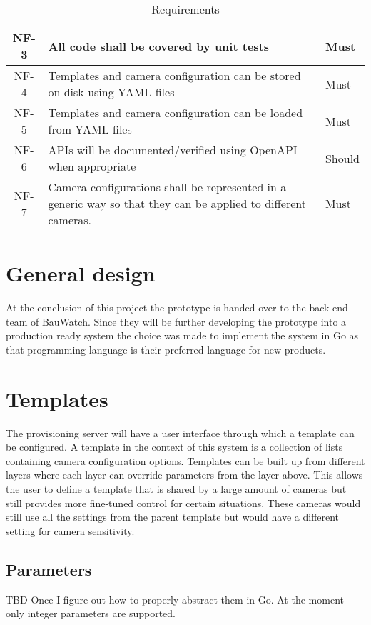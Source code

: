 \begin{table*}[h]
\begin{tabulary}{\linewidth}{CLL}
        \\ \hline
        NF-3 & All code shall be covered by unit tests & Must
        \\ \hline
        NF-4 & Templates and camera configuration can be stored on disk using YAML files & Must
        \\ \hline
        NF-5 & Templates and camera configuration can be loaded from YAML files & Must
        \\ \hline %
        NF-6 & APIs will be documented/verified using OpenAPI when appropriate & Should
        \\ \hline
        NF-7 & Camera configurations shall be represented in a generic way so that they can be applied to different cameras. & Must
    \end{tabulary}
    \caption{Requirements}
    \label{tab:requirements}
\end{table*}

\section{General design}
At the conclusion of this project the prototype is handed over to the back-end team of BauWatch.
Since they will be further developing the prototype into a production ready system the choice was made to implement the system in Go as that programming language is their preferred language for new products.

\section{Templates}
The provisioning server will have a user interface through which a template can be configured.
A template in the context of this system is a collection of lists containing camera configuration options.
Templates can be built up from different layers where each layer can override parameters from the layer above.
This allows the user to define a template that is shared by a large amount of cameras but still provides more fine-tuned control for certain situations.
These cameras would still use all the settings from the parent template but would have a different setting for camera sensitivity.

\subsection{Parameters}
TBD Once I figure out how to properly abstract them in Go.
At the moment only integer parameters are supported.

